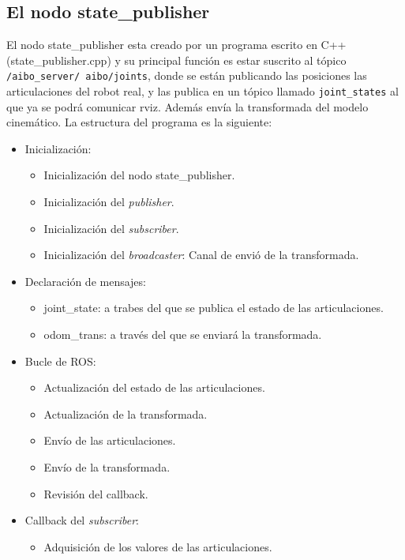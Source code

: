 \documentclass[12pt,a4paper,final,twoside]{book}
\begin{document}
\subsection{El nodo state{\_}publisher}\label{nodoSP}
El nodo state{\_}publisher esta creado por un programa escrito en C++ (state{\_}publisher.cpp) y su principal función es estar suscrito al tópico \texttt{/aibo{\_}server/ aibo/joints}, donde se están publicando las posiciones las articulaciones del robot real, y las publica en un tópico llamado \texttt{joint{\_}states} al que ya se podrá comunicar rviz. Además envía la transformada del modelo cinemático.
La estructura del programa es la siguiente:
\begin{itemize}
\item Inicialización:
\begin{itemize}
\item Inicialización del nodo state{\_}publisher.
\item Inicialización del \textit{publisher}.
\item Inicialización del \textit{subscriber}.
\item Inicialización del \textit{broadcaster}: Canal de envió de la transformada. 
\end{itemize}
\item Declaración de mensajes:
\begin{itemize}
\item joint{\_}state: a trabes del que se publica el estado de las articulaciones.
\item odom{\_}trans: a través del que se enviará la transformada.
\end{itemize}
\item Bucle de ROS:
\begin{itemize}
\item Actualización del estado de las articulaciones.
\item Actualización de la transformada.
\item Envío de las articulaciones.
\item Envío de la transformada.
\item Revisión del callback. 
\end{itemize}
\item Callback del \textit{subscriber}:
\begin{itemize}
\item Adquisición de los valores de las articulaciones.
\end{itemize}
\end{itemize}
\end{document}
